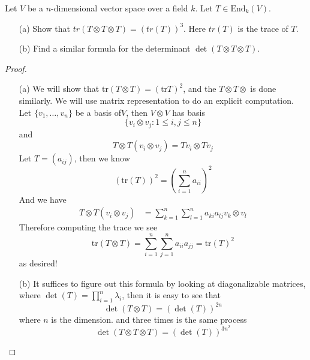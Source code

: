 \documentclass[openany]{book}
\newcommand{\tr}{\text{tr}}
\begin{document}
\begin{prob}
    Let \(V\) be a \(n\)-dimensional vector space over a field \(k\). Let \(T \in \text{End}_k(V)\).
    \begin{itemize}
        \item[(a)] Show that \(tr(T \otimes T \otimes T) = (tr(T))^3\). Here \(tr(T)\) is the trace of \(T\).
        \item[(b)] Find a similar formula for the determinant \(\det(T \otimes T \otimes T)\).
    \end{itemize}
\end{prob}
\begin{proof}
    \begin{itemize}
        \item[(a)] We will show that $\tr(T\otimes T)=(\tr T)^2$, and the $T\otimes T\otimes$ is done similarly. We will use matrix representation to do an explicit computation. Let $\{v_1,\dots, v_n\}$ be a basis of$V$, then $V\otimes V$ has basis 
        \begin{equation*}
            \{v_i\otimes v_j: 1\leq i,j\leq n\}
        \end{equation*}
        and 
        \begin{equation*}
            T\otimes T(v_i\otimes v_j)=Tv_i\otimes Tv_j
        \end{equation*}
        Let $T=(a_{ij})$, then we know 
        \begin{equation*}
            (\tr(T))^2=\left(\sum_{i=1}^na_{ii}\right)^2
        \end{equation*}
        And we have 
        \begin{align*}
            T\otimes T(v_i\otimes v_j)&=\sum_{k=1}^n\sum_{l=1}^na_{ki}a_{lj}v_k\otimes v_l
        \end{align*}
        Therefore computing the trace we see 
        \begin{equation*}
            \tr(T\otimes T)=\sum_{i=1}^n\sum_{j=1}^na_{ii}a_{jj}=\tr(T)^2
        \end{equation*}
        as desired!
        \item[(b)]  It suffices to figure out this formula by looking at diagonalizable matrices, where $\det(T)=\prod_{i=1}^n\lambda_i$, then it is easy to see that 
        \begin{equation*}
            \det(T\otimes T)=\left(\det(T)\right)^{2n}
        \end{equation*}
        where $n$ is the dimension.
        and three times is the same process 
        \begin{equation*}
            \det(T\otimes T\otimes T)=\left(\det(T)\right)^{3n^2}
        \end{equation*}
    \end{itemize}
\end{proof}
\end{document}

